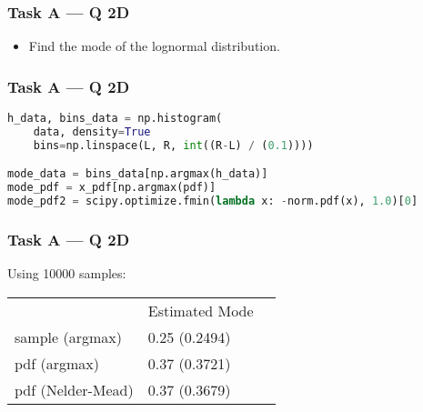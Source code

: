 \documentclass[usenames,dvipsnames]{beamer}
\begin{document}
\begin{frame}
\frametitle{Task A --- Q 2D}
\begin{itemize}
\item Find the mode of the lognormal distribution.
\end{itemize}
\end{frame}

\begin{frame}[fragile]
\frametitle{Task A --- Q 2D}
\begin{lstlisting}[language=Python]
h_data, bins_data = np.histogram(
    data, density=True
    bins=np.linspace(L, R, int((R-L) / (0.1))))

mode_data = bins_data[np.argmax(h_data)]
mode_pdf = x_pdf[np.argmax(pdf)]
mode_pdf2 = scipy.optimize.fmin(lambda x: -norm.pdf(x), 1.0)[0]
\end{lstlisting}
\end{frame}

\begin{frame}
\frametitle{Task A --- Q 2D}
Using 10000 samples:
\begin{table}
\centering
\begin{tabular}{lll}
                  & Estimated Mode \\
sample (argmax)   & 0.25 (0.2494)   \\
pdf (argmax)      & 0.37 (0.3721)   \\
pdf (Nelder-Mead) & 0.37 (0.3679)   \\
\end{tabular}
\end{table}
\end{frame}


\end{document}
